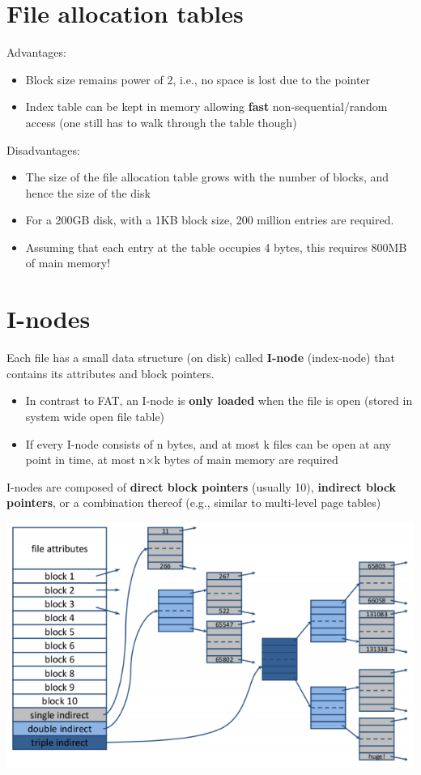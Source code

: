 \documentclass{article}
\begin{document}
\section{File allocation tables}
\begin{flushleft}
Advantages: 
\begin{itemize}
	\item Block size remains power of 2, i.e., no space is lost due to the pointer
	\item Index table can be kept in memory allowing \textbf{fast} non-sequential/random access (one still has to walk through the table though) 
\end{itemize}
Disadvantages:
\begin{itemize}
	\item The size of the file allocation table grows with the number of blocks, and hence the size of the disk
	\item For a 200GB disk, with a 1KB block size, 200 million entries are required.
	\item Assuming that each entry at the table occupies 4 bytes, this requires 800MB of main memory!
\end{itemize}
\end{flushleft}

\section{I-nodes}
\begin{flushleft}
Each file has a small data structure (on disk) called \textbf{I-node} (index-node) that contains its attributes and block pointers. 
\begin{itemize}
	\item In contrast to FAT, an I-node is \textbf{only loaded} when the file is open (stored in system wide open file table)
	\item If every I-node consists of n bytes, and at most k files can be open at any point in time, at most n×k bytes of main memory are required 
\end{itemize}
I-nodes are composed of \textbf{direct block pointers} (usually 10), \textbf{indirect block pointers}, or a combination thereof (e.g., similar to multi-level page tables)
\end{flushleft}
\begin{center}
	\includegraphics[scale=0.4]{i_nodes.png}
\end{center}
\end{document}
